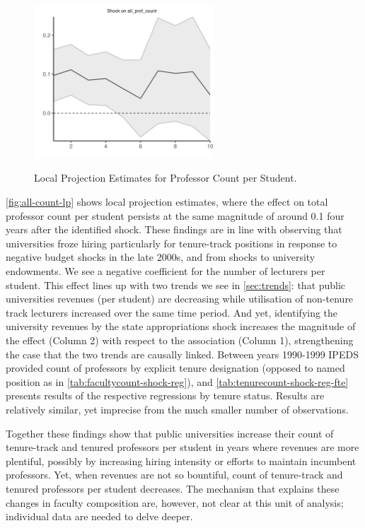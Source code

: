 \documentclass[notitlepage,12pt]{article}
\begin{document}
\begin{figure}[h!]
    \centering
    \singlespacing
    \caption{Local Projection Estimates for Professor Count per Student.}
    \includegraphics[width=0.6\textwidth]{figures/all-count-lp.png}
    \label{fig:all-count-lp}
\end{figure}
\autoref{fig:all-count-lp} shows local projection estimates, where the effect on total professor count per student persists at the same magnitude of around 0.1 four years after the identified shock.
These findings are in line with \cite{turner2014impact} observing that universities froze hiring particularly for tenure-track positions in response to negative budget shocks in the late 2000s, and \cite{brown2014endowment} from shocks to university endowments.
We see a negative coefficient for the number of lecturers per student.
This effect lines up with two trends we see in \autoref{sec:trends}: that public universities revenues (per student) are decreasing while utilisation of non-tenure track lecturers increased over the same time period.
And yet, identifying the university revenues by the state appropriations shock increases the magnitude of the effect (Column 2) with respect to the association (Column 1), strengthening the case that the two trends are causally linked.
Between years 1990-1999 IPEDS provided count of professors by explicit tenure designation (opposed to named position as in \autoref{tab:facultycount-shock-reg}), and \autoref{tab:tenurecount-shock-reg-fte} presents results of the respective regressions by tenure status.
Results are relatively similar, yet imprecise from the much smaller number of observations.

Together these findings show that public universities increase their count of tenure-track and tenured professors per student in years where revenues are more plentiful, possibly by increasing hiring intensity or efforts to maintain incumbent professors.
Yet, when revenues are not so bountiful, count of tenure-track and tenured professors per student decreases.
The mechanism that explains these changes in faculty composition are, however, not clear at this unit of analysis; individual data are needed to delve deeper.
\end{document}
